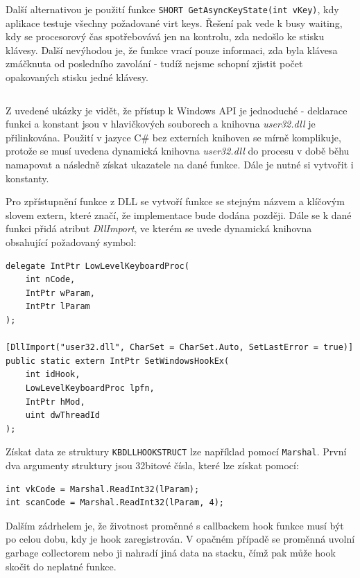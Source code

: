\documentclass[12pt]{article}
\newcommand{\Csh}{C\#}
\begin{document}
Další alternativou je použití funkce \texttt{SHORT GetAsyncKeyState(int vKey)}, kdy aplikace testuje všechny požadované virt keys. 
Řešení pak vede k busy waiting, kdy se procesorový čas spotřebovává jen na kontrolu, zda nedošlo ke stisku klávesy.
Další nevýhodou je, že funkce vrací pouze informaci, zda byla klávesa zmáčknuta od posledního zavolání - tudíž nejsme schopní zjistit počet opakovaných stisku jedné klávesy.


\inputminted{c}{../c/simple.c}


Z uvedené ukázky je vidět, že přístup k Windows API je jednoduché - deklarace funkci a konstant jsou v hlavičkových souborech a knihovna \textit{user32.dll} je přilinkována.
Použití v jazyce \Csh{} bez externích knihoven se mírně komplikuje, protože se musí uvedena dynamická knihovna \textit{user32.dll} do procesu v době běhu namapovat a následně získat ukazatele na dané funkce.
Dále je nutné si vytvořit i konstanty.

Pro zpřístupnění funkce z DLL se vytvoří funkce se stejným názvem a klíčovým slovem extern, které značí, že implementace bude dodána později.
Dále se k dané funkci přidá atribut \textit{DllImport}, ve kterém se uvede dynamická knihovna obsahující požadovaný symbol:


\begin{verbatim}
delegate IntPtr LowLevelKeyboardProc(
	int nCode,
	IntPtr wParam,
	IntPtr lParam
);

[DllImport("user32.dll", CharSet = CharSet.Auto, SetLastError = true)]
public static extern IntPtr SetWindowsHookEx(
	int idHook,
	LowLevelKeyboardProc lpfn,
	IntPtr hMod,
	uint dwThreadId
);
\end{verbatim}

Získat data ze struktury \texttt{KBDLLHOOKSTRUCT} lze například pomocí \texttt{Marshal}.
První dva argumenty struktury jsou 32bitové čísla, které lze získat pomocí: 
\begin{verbatim}
int vkCode = Marshal.ReadInt32(lParam);
int scanCode = Marshal.ReadInt32(lParam, 4);
\end{verbatim}

Dalším zádrhelem je, že životnost proměnné s callbackem hook funkce musí být po celou dobu, kdy je hook zaregistrován.
V opačném případě se proměnná uvolní garbage collectorem nebo ji nahradí jiná data na stacku, čímž pak může hook skočit do neplatné funkce.
\end{document}
